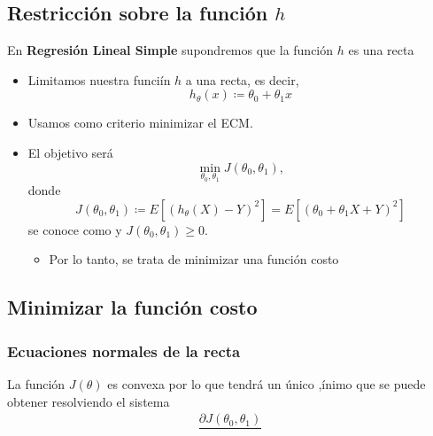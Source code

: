 \subsection{Restricción sobre la función $h$}
En \textbf{Regresión Lineal Simple} supondremos que la función $h$ es una recta
\begin{itemize}
\item Limitamos nuestra funciín $h$ a una recta, es decir, \[ h_\theta(x)\coloneq\theta_0+\theta_1x \]
\item Usamos como criterio minimizar el ECM.
\item El objetivo será \[ \min_{\theta_0,\theta_1}J(\theta_0,\theta_1), \] donde \[ J(\theta_0,\theta_1)\coloneq E[(h_\theta(X)-Y)^2]=E[(\theta_0+\theta_1X+Y)^2] \]se conoce como  y $J(\theta_0,\theta_1)\ge0$.
\begin{itemize}[label=$\to$]
\item Por lo tanto, se trata de minimizar una función costo
\end{itemize}
\end{itemize}
\subsection{Minimizar la función costo}
\subsubsection{Ecuaciones normales de la recta}
La función $J(\theta)$ es convexa por lo que tendrá un único ,ínimo que se puede obtener resolviendo el sistema \[ \begin{array}{l}
\dfrac{\partial J(\theta_0,\theta_1)}{}
\end{array} \]